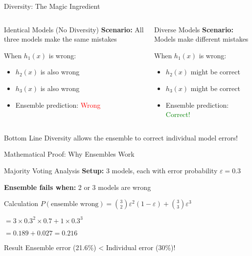 \documentclass[10pt]{beamer}
\begin{document}
\begin{frame}{Diversity: The Magic Ingredient}
\begin{columns}
\begin{column}{0.5\textwidth}
\begin{alertbox}{Identical Models (No Diversity)}
\textbf{Scenario:} All three models make the same mistakes

When $h_1(x)$ is wrong:
\begin{itemize}
\item $h_2(x)$ is also wrong
\item $h_3(x)$ is also wrong
\item Ensemble prediction: \textcolor{red}{Wrong}
\end{itemize}
\end{alertbox}
\end{column}

\begin{column}{0.5\textwidth}
\begin{examplebox}{Diverse Models}
\textbf{Scenario:} Models make different mistakes

When $h_1(x)$ is wrong:
\begin{itemize}
\item $h_2(x)$ might be correct
\item $h_3(x)$ might be correct
\item Ensemble prediction: \textcolor{green}{Correct!}
\end{itemize}
\end{examplebox}
\end{column}
\end{columns}

\begin{keypointsbox}{Bottom Line}
Diversity allows the ensemble to correct individual model errors!
\end{keypointsbox}
\end{frame}
\begin{frame}{Mathematical Proof: Why Ensembles Work}
\begin{definitionbox}{Majority Voting Analysis}
\textbf{Setup:} 3 models, each with error probability $\varepsilon = 0.3$

\textbf{Ensemble fails when:} 2 or 3 models are wrong
\end{definitionbox}

\begin{examplebox}{Calculation}
$P(\text{ensemble wrong}) = \binom{3}{2}\varepsilon^2(1-\varepsilon) + \binom{3}{3}\varepsilon^3$

$= 3 \times 0.3^2 \times 0.7 + 1 \times 0.3^3$

$= 0.189 + 0.027 = \mathbf{0.216}$
\end{examplebox}

\begin{keypointsbox}{Result}
Ensemble error (21.6\%) < Individual error (30\%)!
\end{keypointsbox}
\end{frame}
\end{document}
